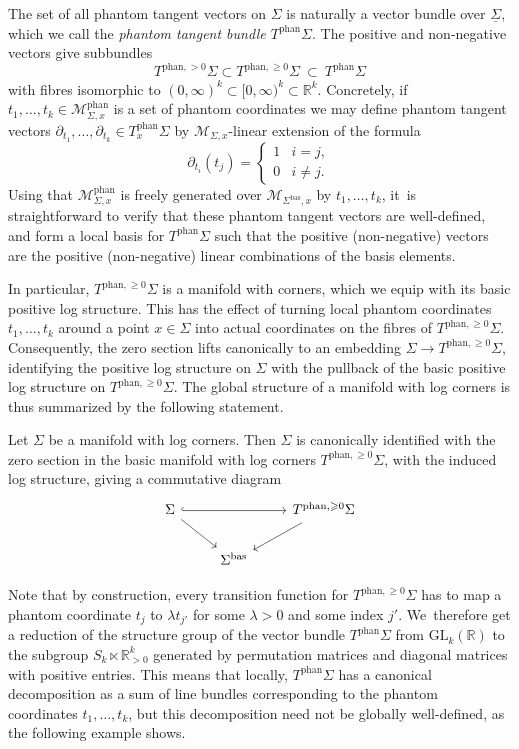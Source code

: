 \documentclass[JEP,XML,SOM,Unicode,NoFloatCountersInSection,published]{cedram}
\theoremstyle{definition}
\theoremstyle{remark}
\let\defn\emph
\newcommand{\RR}{\mathbb{R}}
\newcommand{\halfspc}[1]{[0,\infty)^{#1}}
\renewcommand{\ge}{\geqslant}
\newcommand{\cM}{\mathscr{M}}
\newcommand{\cMphan}{\mathscr{M}^{\mathrm{phan}}}
\newcommand{\cvf}[1]{\partial_{#1}}
\newcommand{\Sig}{\Sigma}
\newcommand{\uSig}{\underline{\Sigma}}
\newcommand{\bas}[1]{{#1}^{\mathrm{bas}}}
\newcommand{\phant}{\mathrm{phan}}
\newcommand{\Sigbas}{\bas{\Sig}}
\newcommand{\tbphan}[2][]{T_{#1}^{\phant}#2}
\newcommand{\tbposphan}[2][]{T^{\phant,>0}_{#1}#2}
\newcommand{\tbgephan}[2][]{T^{\phant,\ge0}_{#1}#2}
\newcommand{\GL}[2]{\mathrm{GL}_{#1}(#2)}
\begin{document}
The set of all phantom tangent vectors on $\Sig$ is naturally a vector bundle over $\uSig$, which we call the \defn{phantom tangent bundle $\tbphan{\Sig}$}. The positive and non-negative vectors give subbundles
\[
\tbposphan{\Sig}\subset \tbgephan{\Sig} \ \subset\ \tbphan{\Sig}
\]
with fibres isomorphic to $(0,\infty)^k \subset \halfspc{k}\subset \RR^k$. Concretely, if $t_1,\ldots,t_k \in \cMphan_{\Sig,x}$ is a set of phantom coordinates we may define phantom tangent vectors $\cvf{t_1},\ldots,\cvf{t_k} \in \tbphan[x]{\Sig}$ by $\cM_{\Sig,x}$-linear extension of the formula
\[
\cvf{t_i}(t_j) = \begin{cases}
1 & i=j, \\
0 & i \neq j.
\end{cases}
\]
Using that $\cMphan_{\Sig,x}$ is freely generated over $\cM_{\Sigbas,x}$ by $t_1,\ldots,t_k$, it~is straightforward to verify that these phantom tangent vectors are well-defined, and form a local basis for $\tbphan{\Sig}$ such that the positive (\resp non-negative) vectors are the positive (\resp non-negative) linear combinations of the basis elements.

In particular, $\tbgephan{\Sig}$ is a manifold with corners, which we equip with its basic positive log structure. This has the effect of turning local phantom coordinates $t_1,\ldots,t_k$ around a point $x\in \Sig$ into actual coordinates on the fibres of $\tbgephan{\Sig}$. Consequently, the zero section lifts canonically to an embedding $\Sig \to \tbgephan{\Sig}$, identifying the positive log structure on $\Sig$ with the pullback of the basic positive log structure on $\tbgephan{\Sig}$. The global structure of a manifold with log corners is thus summarized by the following statement.
\begin{proposition}\label{prop:embedding-in-phantom-tangent}
Let $\Sig$ be a manifold with log corners. Then $\Sig$ is canonically identified with the zero section in the basic manifold with log corners $\tbgephan{\Sig}$, with the induced log structure, giving a commutative diagram
\[
\begin{tikzcd}
\Sig \ar[rr,hook]\ar[rd] && \tbgephan{\Sig}\ar[ld] \\
& \Sigbas
\end{tikzcd}
\]
\end{proposition}

Note that by construction, every transition function for $\tbgephan{\Sig}$ has to map a phantom coordinate $t_j$ to $\lambda t_{j'}$ for some $\lambda>0$ and some index $j'$. We~therefore get a reduction of the structure group of the vector bundle $\tbphan{\Sig}$ from $\GL{k}{\RR}$ to the subgroup $S_k \ltimes \RR_{>0}^{k}$ generated by permutation matrices and diagonal matrices with positive entries. This means that locally, $\tbphan{\Sig}$ has a canonical decomposition as a sum of line bundles corresponding to the phantom coordinates $t_1,\ldots,t_k$, but this decomposition need not be globally well-defined, as the following example shows.
\end{document}
